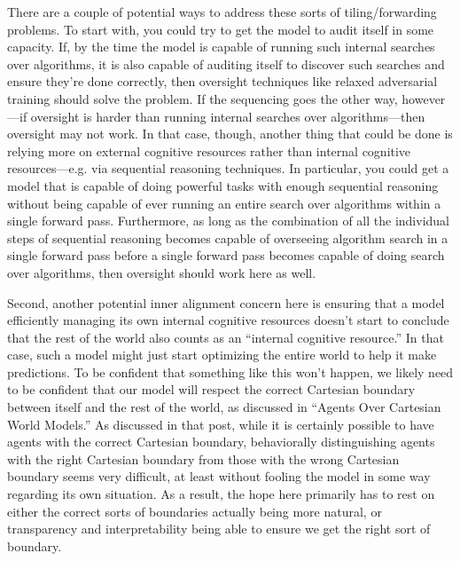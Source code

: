 {There are a couple of potential ways to address these sorts of tiling/forwarding problems. To start with, you could try to get the model to audit itself in some capacity. If, by the time the model is capable of running such internal searches over algorithms, it is also capable of auditing itself to discover such searches and ensure they're done correctly, then oversight techniques like relaxed adversarial training\cite{TODO: cite https://www.alignmentforum.org/posts/9Dy5YRaoCxH9zuJqa/relaxed-adversarial-training-for-inner-alignment} should solve the problem. If the sequencing goes the other way, however---if oversight is harder than running internal searches over algorithms---then oversight may not work. In that case, though, another thing that could be done is relying more on external cognitive resources rather than internal cognitive resources---e.g. via sequential reasoning techniques. In particular, you could get a model that is capable of doing powerful tasks with enough sequential reasoning without being capable of ever running an entire search over algorithms within a single forward pass. Furthermore, as long as the combination of all the individual steps of sequential reasoning becomes capable of overseeing algorithm search in a single forward pass before a single forward pass becomes capable of doing search over algorithms, then oversight should work here as well.

Second, another potential inner alignment concern here is ensuring that a model efficiently managing its own internal cognitive resources doesn't start to conclude that the rest of the world also counts as an ``internal cognitive resource.'' In that case, such a model might just start optimizing the entire world to help it make predictions. To be confident that something like this won't happen, we likely need to be confident that our model will respect the correct Cartesian boundary between itself and the rest of the world, as discussed in ``Agents Over Cartesian World Models\cite{TODO: cite https://www.alignmentforum.org/posts/LBNjeGaJZw7QdybMw/agents-over-cartesian-world-models}.'' As discussed in that post, while it is certainly possible to have agents with the correct Cartesian boundary, behaviorally distinguishing agents with the right Cartesian boundary from those with the wrong Cartesian boundary seems very difficult, at least without fooling the model in some way regarding its own situation. As a result, the hope here primarily has to rest on either the correct sorts of boundaries actually being more natural, or transparency and interpretability being able to ensure we get the right sort of boundary.


}
